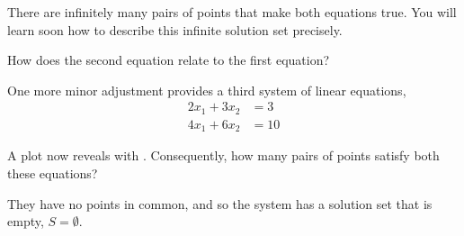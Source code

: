\documentclass{ximera}
\begin{document}
\begin{problem}
\begin{example}
    \begin{feedback}
      There are infinitely many pairs of points that make both equations true.  You will learn soon how to describe this infinite solution set precisely.
    \end{feedback}

    How does the second equation relate to the first equation?
    \begin{multipleChoice}
    \end{multipleChoice}
  \end{example}

  \begin{example}
    One more minor adjustment provides a third system of linear equations,
    \begin{align*}
      2x_1+3x_2&=3\\
      4x_1+6x_2&=10
    \end{align*}

    A plot now reveals  with .  Consequently, how many pairs of points satisfy both these equations?
    \begin{multipleChoice}
    \end{multipleChoice}    

    \begin{feedback}
      They have no points in common, and so the system has a solution set that is empty, $S=\emptyset$.
    \end{feedback}
  \end{example}


\end{problem}
\end{document}
